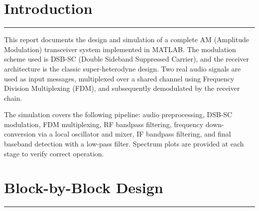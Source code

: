 \documentclass[a4paper]{article}
\begin{document}

\section*{\textcolor{DodgerBlue4}{\huge {}  Introduction}}
\vspace{0.5cm}
    \noindent\textcolor{DeepSkyBlue4}{\rule{\textwidth}{0.05pt}}
    
    \noindent This report documents the design and simulation of a complete AM (Amplitude Modulation) transceiver system implemented in MATLAB. The modulation scheme used is DSB-SC (Double Sideband Suppressed Carrier), and the receiver architecture is the classic super-heterodyne design. Two real audio signals are used as input messages, multiplexed over a shared channel using Frequency Division Multiplexing (FDM), and subsequently demodulated by the receiver chain.
    
    \vspace{\baselineskip}

    \noindent The simulation covers the following pipeline: audio preprocessing, DSB-SC modulation, FDM multiplexing, RF bandpass filtering, frequency down-conversion via a local oscillator and mixer, IF bandpass filtering, and final baseband detection with a low-pass filter. Spectrum plots are provided at each stage to verify correct operation. \vspace{1cm}
    


\section*{\textcolor{DodgerBlue4}{\huge   {} Block-by-Block Design}}
    \vspace{0.5cm}
    \noindent\textcolor{DeepSkyBlue4}{\rule{\textwidth}{0.05pt}}
    
\end{document}
